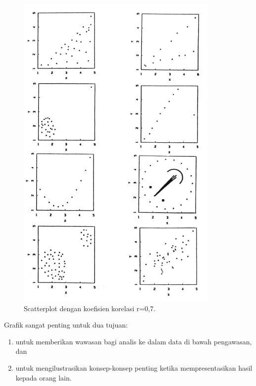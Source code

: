 \documentclass[]{book}
\providecommand{\tightlist}{%
  \setlength{\itemsep}{0pt}\setlength{\parskip}{0pt}}
\begin{document}
\begin{figure}

{\centering \includegraphics[width=0.9\linewidth]{visscat} 

}

\caption{Scatterplot dengan koefisien korelasi r=0,7.}\label{fig:visscat}
\end{figure}

Grafik sangat penting untuk dua tujuan:

\begin{enumerate}
\def\labelenumi{\arabic{enumi}.}
\tightlist
\item
  untuk memberikan wawasan bagi analis ke dalam data di bawah
  pengawasan, dan
\item
  untuk mengilustrasikan konsep-konsep penting ketika mempresentasikan
  hasil kepada orang lain.
\end{enumerate}
\end{document}
